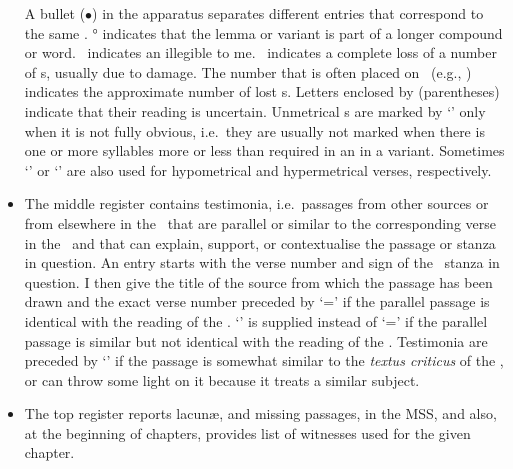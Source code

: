 \begin{itemize}
A bullet ($\bullet$) in the apparatus separates different entries that correspond to
the same .
° indicates that the lemma or variant is part of a longer compound or word. 
\lk\ indicates an  illegible to me.
\lac\ indicates a complete loss of a number of s, usually due to damage.
The number that is often placed on \lac\ (e.g., ) indicates the approximate
number of lost s.
Letters enclosed by (parentheses) indicate that their reading is uncertain. 
Unmetrical s are marked by `\unmetr' only when it is not fully obvious,
i.e.\ they are usually not marked when there is one or more syllables more 
or less than required in an  in a variant.
Sometimes `\hypometr' or `\hypermetr' are also used for hypometrical and hypermetrical verses, respectively.


\item The middle register contains testimonia, i.e.\ passages from other sources
or from elsewhere in the \VSS\ that are parallel or similar to the
corresponding verse in the \VSS\ and that can explain, support, or
contextualise the passage or stanza in question.
An entry starts with the verse number and  sign of the \VSS\ stanza in question. %
I then give the title of the source from which the passage has been drawn
and the exact verse number preceded by `=' if the parallel
passage is identical with the reading of the \VSS. 
`\similar' is supplied instead of `=' if the parallel passage
is similar but not identical with the reading of the \VSS.
Testimonia are preceded by `\compare' if the passage is somewhat similar to the \textit{textus criticus} of the
\VSS, or can throw some light on it because it treats a similar subject. 

\item The top register reports lacun\ae{}, and missing passages, in the MSS, and also, at the beginning of
chapters, provides list of witnesses used for the given chapter.


\end{itemize}

